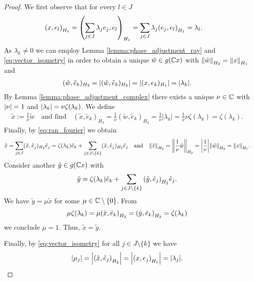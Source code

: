 \begin{proof}
	We first observe that for every $l \in J$ 
	\begin{align}
		\pbraces{x, e_l}_{H_1} &= \pbraces{\sum_{j \in J} \lambda_j e_j, e_l}_{H_1} = \sum_{j \in J} \lambda_j \pbraces{e_j, e_l}_{H_1} = \lambda_l. \label{eq:aux_fouriercoef}
	\end{align}
	As $\lambda_k \neq 0$ we can employ Lemma \ref{lemma:phase_adjustment_ray} and \eqref{eq:vector_isometry} in order to obtain a unique $\tilde{w} \in g(\C x)$ with $\norm[H_2]{\tilde{w}} = \norm[H_1]{x}$ and 
	\begin{align*}
		(\tilde{w}, \tilde{e}_k)_{H_2} = |(\tilde{w}, \tilde{e}_k)_{H_2}| = |(x, e_k)_{H_1}| = \vbraces{\lambda_k}.
	\end{align*}
	By Lemma \ref{lemma:phase_adjustment_complex} there exists a unique $\nu \in \C$ with $\vbraces{\nu} = 1$ and $\vbraces{\lambda_k} = \nu \zeta\pbraces{\lambda_k}$. We define
	\begin{align*}
		\tilde{x} := \frac{1}{\nu} \tilde{w} \quad \text{and find} \quad (\tilde{x}, \tilde{e}_k)_{H_2} = \frac{1}{\nu} (\tilde{w}, \tilde{e}_k)_{H_2} = \frac{1}{\nu} |\lambda_k| = \frac{1}{\nu} \nu \zeta(\lambda_k) = \zeta(\lambda_k).
	\end{align*} 
	Finally, by \eqref{eq:ran_fourier} we obtain
	\begin{align*}
		\tilde{x} = \sum_{j \in J} (\tilde{x}, \tilde{e}_j)_{H_2} \tilde{e}_j = \zeta(\lambda_k) \tilde{e}_k + \sum_{j \in J \setminus \{k\}} (\tilde{x}, \tilde{e}_j)_{H_2} \tilde{e}_j \quad \text{and} \quad \norm[H_2]{\tilde{x}} = \norm[H_2]{\frac{1}{\nu}\tilde{w}} = \vbraces{\frac{1}{\nu}} \norm[H_2]{\tilde{w}} = \norm[H_1]{x}. 
	\end{align*}
	Consider another $\tilde{y} \in g\pbraces{\C x}$ with
	\begin{align*}
		\tilde{y} = \zeta(\lambda_k) \tilde{e}_k + \sum_{j \in J \setminus \{k\}} \pbraces{\tilde{y}, \tilde{e}_j}_{H_2} \tilde{e}_j.
	\end{align*}
	We have $\tilde{y} = \mu \tilde{x}$ for some $\mu \in \C \setminus \{0\}$. From 
	\begin{align*}
		\mu \zeta\pbraces{\lambda_k} = \mu \pbraces{\tilde{x}, \tilde{e}_k}_{H_2} = \pbraces{\tilde{y}, \tilde{e}_k}_{H_2} = \zeta\pbraces{\lambda_k}
	\end{align*}
	we conclude $\mu = 1$. Thus, $\tilde{x} = \tilde{y}$. 
	
	Finally, by \eqref{eq:vector_isometry} for all $j \in J \setminus \{k\}$ we have 
	\begin{align*}
		\vbraces{\mu_j} = \vbraces{\pbraces{\tilde{x}, \tilde{e}_j}_{H_2}} = \vbraces{\pbraces{x, e_j}_{H_1}} = \vbraces{\lambda_j}.
	\end{align*}
\end{proof}


